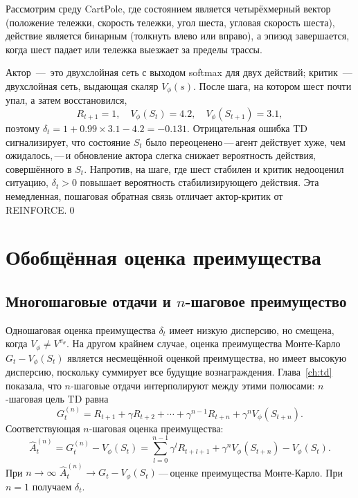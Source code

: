 \begin{example}
\label{ex:cartpole-ac}
Рассмотрим среду CartPole, где состоянием является четырёхмерный вектор (положение тележки, скорость тележки, угол шеста, угловая скорость шеста), действие является бинарным (толкнуть влево или вправо), а эпизод завершается, когда шест падает или тележка выезжает за пределы трассы.

Актор \,---\, это двухслойная сеть с выходом softmax для двух действий; критик \,---\, двухслойная сеть, выдающая скаляр $V_\phi(s)$. После шага, на котором шест почти упал, а затем восстановился,
\[
R_{t+1} = 1,\quad V_\phi(S_t) = 4.2,\quad V_\phi(S_{t+1}) = 3.1,
\]
поэтому $\delta_t = 1 + 0.99 \times 3.1 - 4.2 = -0.131$. Отрицательная ошибка TD сигнализирует, что состояние $S_t$ было переоценено\,---\,агент действует хуже, чем ожидалось,\,---\,и обновление актора слегка снижает вероятность действия, совершённого в $S_t$. Напротив, на шаге, где шест стабилен и критик недооценил ситуацию, $\delta_t > 0$ повышает вероятность стабилизирующего действия. Эта немедленная, пошаговая обратная связь отличает актор-критик от REINFORCE.\qed
\end{example}

\section{Обобщённая оценка преимущества}
\label{sec:gae-ch9}

\subsection{Многошаговые отдачи и $n$-шаговое преимущество}

Одношаговая оценка преимущества $\delta_t$ имеет низкую дисперсию, но смещена, когда $V_\phi \neq V^{\pi_\theta}$. На другом крайнем случае, оценка преимущества Монте-Карло $G_t - V_\phi(S_t)$ является несмещённой оценкой преимущества, но имеет высокую дисперсию, поскольку суммирует все будущие вознаграждения. Глава~\ref{ch:td} показала, что $n$-шаговые отдачи интерполируют между этими полюсами: $n$-шаговая цель TD равна
\[
G_t^{(n)} = R_{t+1} + \gamma R_{t+2} + \cdots + \gamma^{n-1}R_{t+n}
             + \gamma^n V_\phi(S_{t+n}).
\]
Соответствующая $n$-шаговая оценка преимущества:
\begin{equation}
\label{eq:n-step-advantage}
\hat{A}_t^{(n)}
= G_t^{(n)} - V_\phi(S_t)
= \sum_{l=0}^{n-1} \gamma^l R_{t+l+1} + \gamma^n V_\phi(S_{t+n})
  - V_\phi(S_t).
\end{equation}
При $n \to \infty$ $\hat{A}_t^{(n)} \to G_t - V_\phi(S_t)$\,---\,оценке преимущества Монте-Карло. При $n = 1$ получаем $\delta_t$.

